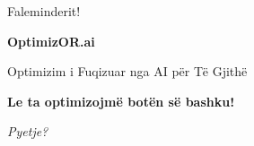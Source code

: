 \documentclass[aspectratio=169]{beamer}
\begin{document}

\begin{frame}{Faleminderit!}
\begin{center}
\LARGE \textbf{OptimizOR.ai}

\large Optimizim i Fuqizuar nga AI për Të Gjithë

\vspace{1cm}



\vspace{1cm}

\Large \textcolor{aiblue}{\textbf{Le ta optimizojmë botën së bashku!}}

\vspace{0.5cm}

\normalsize
\textit{Pyetje?}
\end{center}
\end{frame}

\appendix


    
    
    
    
    
\end{document}
